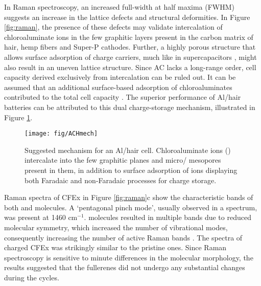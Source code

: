 \documentclass{article}
\begin{document}
In Raman spectroscopy, an increased full-width at half maxima (FWHM) suggests an increase in the lattice defects and structural deformities. In Figure \ref{fig:raman}, the presence of these defects may validate intercalation of chloroaluminate ions in the few graphitic layers present in the carbon matrix of hair, hemp fibers and Super-P cathodes. Further, a highly porous structure that allows surface adsorption of charge carriers, much like in supercapacitors \cite{beguin_carbons_2014}, might also result in an uneven lattice structure. Since AC lacks a long-range order, cell capacity derived exclusively from intercalation can be ruled out. It can be assumed that an additional surface-based adsorption of chloroaluminates contributed to the total cell capacity \cite{brezesinski_ordered_2010}. The superior performance of Al/hair batteries can be attributed to this dual charge-storage mechanism, illustrated in Figure \ref{fig:ACHmech}.

\begin{figure}
  \centering
  \texttt{[image: fig/ACHmech]}
    \caption{Suggested mechanism for an Al/hair cell. Chloroaluminate ions () intercalate into the few graphitic planes and micro/ mesopores present in them, in addition to surface adsorption of ions displaying both Faradaic and non-Faradaic processes for charge storage.}
  \label{fig:ACHmech}
\end{figure}

Raman spectra of CFEx in Figure \ref{fig:raman}c show the characteristic bands of both  and  molecules. A `pentagonal pinch mode', usually observed in a  spectrum, was present at 1460 cm$^{-1}$.  molecules resulted in multiple bands due to reduced molecular symmetry, which increased the number of vibrational modes, consequently increasing the number of active Raman bands \cite{kimbrell_analysis_2014}. The spectra of charged CFEx was strikingly similar to the pristine ones. Since Raman spectroscopy is sensitive to minute differences in the molecular morphology, the results suggested that the fullerenes did not undergo any substantial changes during the cycles. 
\end{document}
